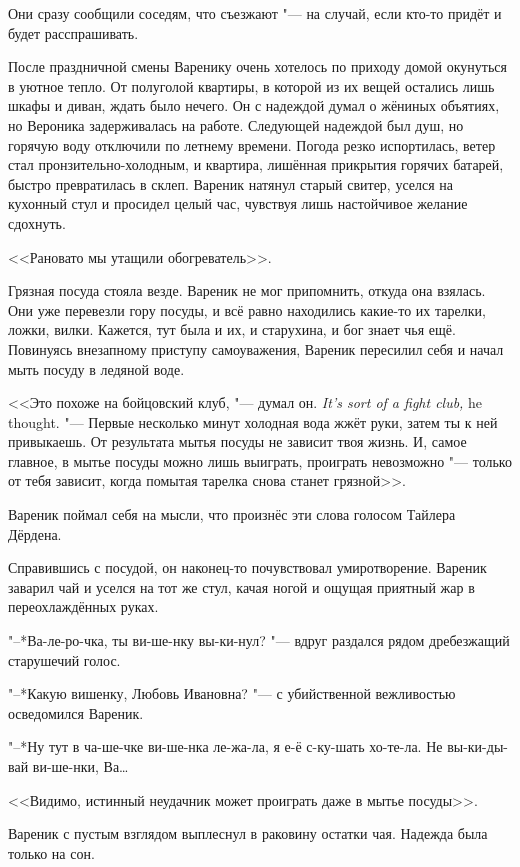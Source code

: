 Они сразу сообщили соседям, что съезжают "--- на случай, если кто-то придёт и будет расспрашивать.

После праздничной смены Варенику очень хотелось по приходу домой окунуться в уютное тепло.
От полуголой квартиры, в которой из их вещей остались лишь шкафы и диван, ждать было нечего.
Он с надеждой думал о жёниных объятиях, но Вероника задерживалась на работе.
Следующей надеждой был душ, но горячую воду отключили по летнему времени.
Погода резко испортилась, ветер стал пронзительно-холодным, и квартира, лишённая прикрытия горячих батарей, быстро превратилась в склеп.
Вареник натянул старый свитер, уселся на кухонный стул и просидел целый час, чувствуя лишь настойчивое желание сдохнуть.

<<Рановато мы утащили обогреватель>>.

Грязная посуда стояла везде.
Вареник не мог припомнить, откуда она взялась.
Они уже перевезли гору посуды, и всё равно находились какие-то их тарелки, ложки, вилки.
Кажется, тут была и их, и старухина, и бог знает чья ещё.
Повинуясь внезапному приступу самоуважения, Вареник пересилил себя и начал мыть посуду в ледяной воде.

{<<Это похоже на бойцовский клуб, "--- думал он.}
{\textit{It's sort of a fight club,} he thought.}
"--- Первые несколько минут холодная вода жжёт руки, затем ты к ней привыкаешь.
От результата мытья посуды не зависит твоя жизнь.
И, самое главное, в мытье посуды можно лишь выиграть, проиграть невозможно "--- только от тебя зависит, когда помытая тарелка снова станет грязной>>.

Вареник поймал себя на мысли, что произнёс эти слова голосом Тайлера Дёрдена.

Справившись с посудой, он наконец-то почувствовал умиротворение.
Вареник заварил чай и уселся на тот же стул, качая ногой и ощущая приятный жар в переохлаждённых руках.

"--*Ва-ле-ро-чка, ты ви-ше-нку вы-ки-нул? "--- вдруг раздался рядом дребезжащий старушечий голос.

"--*Какую вишенку, Любовь Ивановна? "--- с убийственной вежливостью осведомился Вареник.

"--*Ну тут в ча-ше-чке ви-ше-нка ле-жа-ла, я е-ё с-ку-шать хо-те-ла.
Не вы-ки-ды-вай ви-ше-нки, Ва\ldots{}

<<Видимо, истинный неудачник может проиграть даже в мытье посуды>>.

Вареник с пустым взглядом выплеснул в раковину остатки чая.
Надежда была только на сон.

